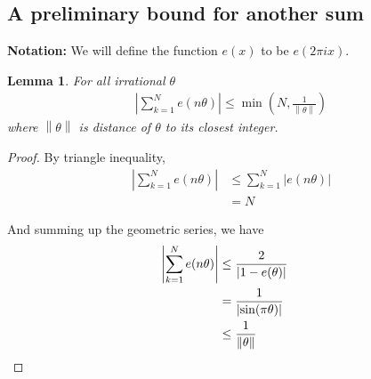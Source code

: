 \documentclass[12pt]{article}
\newtheorem{lem}[thm]{Lemma}
\theoremstyle{definition}
\newcommand{\norm}[1]{\left\lVert#1\right\rVert}
\begin{document}
\subsection{A preliminary bound for another sum}
\textbf{Notation:} We will define the function $e(x)$ to be $e(2\pi i x)$.

\begin{lem}
    For all irrational $\theta$
    \begin{align}
    \displaystyle \left| \sum_{k=1}^{N} e(n\theta) \right| \leq \min\left(N, \frac{1}{\norm{\theta}} \right) \label{bound:1}
    \end{align}
    where $\norm{\theta}$ is distance of $\theta$ to its closest integer.
\end{lem}

\begin{proof}
    By triangle inequality,
    \begin{align*}
        \left| \sum_{k=1}^{N} e(n\theta) \right| & \leq \sum_{k=1}^{N} \left| e(n\theta) \right| \\
        &= N
    \end{align*}
    
    And summing up the geometric series, we have
    \begin{align*}
        \left| \sum_{k=1}^{N} e(n\theta) \right| &\leq \frac{2}{\left| 1- e(\theta) \right|} \\
        &= \frac{1}{\left| \sin(\pi \theta) \right|}\\
        &\leq \frac{1}{\norm{\theta}} &\qedhere
    \end{align*}
\end{proof}
 
\end{document}
